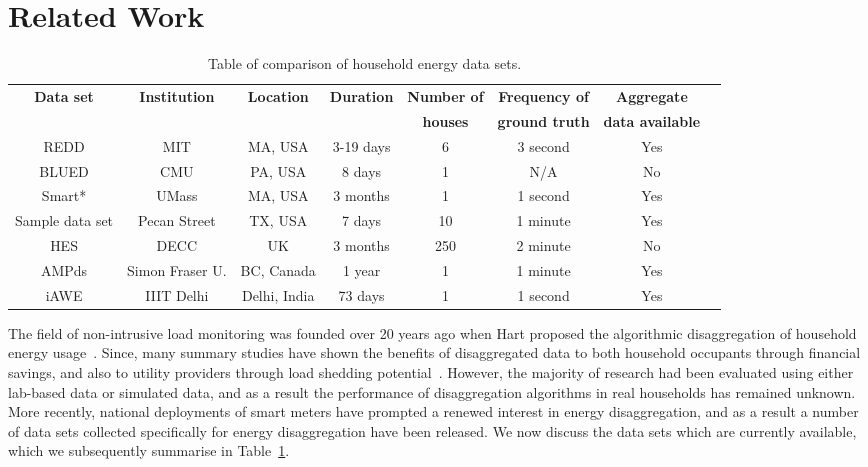 \documentclass{sig-alternate}
\newcommand{\tabref}[1]{Table~\ref{#1}}
\begin{document}
\section{Related Work}
\label{sec:related}

\begin{table}[]
  \centering
  \begin{tabular}{c c c c c c c c}
    \hline
    \bf Data set & \bf Institution & \bf Location & \bf Duration & \bf Number of & \bf Frequency of & \bf Aggregate\\
    \bf  & \bf  & \bf  & \bf  & \bf houses & \bf ground truth & \bf data available\\
    \hline
    REDD & MIT & MA, USA & 3-19 days & 6 & 3 second & Yes\\
    BLUED & CMU & PA, USA & 8 days & 1 & N/A & No\\
    Smart* & UMass & MA, USA & 3 months & 1 & 1 second & Yes\\
    Sample data set & Pecan Street & TX, USA & 7 days & 10 & 1 minute & Yes\\
    HES & DECC & UK & 3 months & 250 & 2 minute & No\\
    AMPds & Simon Fraser U. & BC, Canada & 1 year & 1 & 1 minute & Yes\\
    iAWE & IIIT Delhi & Delhi, India & 73 days & 1 & 1 second & Yes\\
    \hline
  \end{tabular}
  \caption{Table of comparison of household energy data sets.}
  \label{table:datasets}
\end{table}

The field of non-intrusive load monitoring was founded over 20 years ago when Hart proposed the algorithmic disaggregation of household energy usage~\cite{hart_1992}. Since, many summary studies have shown the benefits of disaggregated data to both household occupants through financial savings, and also to utility providers through load shedding potential~\cite{zeifman_2011,armel_2013}. However, the majority of research had been evaluated using either lab-based data or simulated data, and as a result the performance of disaggregation algorithms in real households has remained unknown. More recently, national deployments of smart meters have prompted a renewed interest in energy disaggregation, and as a result a number of data sets collected specifically for energy disaggregation have been released. We now discuss the data sets which are currently available, which we subsequently summarise in \tabref{table:datasets}.
\end{document}
